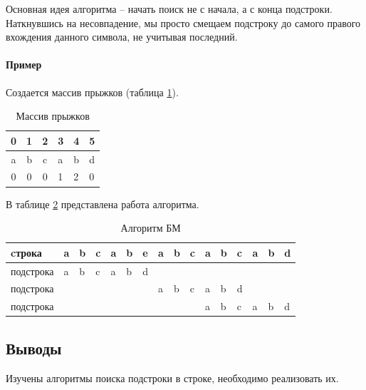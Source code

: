 \documentclass[a4paper,12pt]{article}
\begin{document}
Основная идея алгоритма -- начать поиск не с начала, а с конца
подстроки. Наткнувшись на несовпадение, мы просто смещаем подстроку
до самого правого вхождения данного символа, не учитывая последний.

\paragraph{Пример}

Создается массив прыжков (таблица \ref{table:example2}).

\begin{table}[H]
    \centering
    \caption{Массив прыжков}
    \label{table:example2}
    \begin{tabular}{|c|c|c|l|l|l|}
    \hline
    0 & 1 & 2 & 3 & 4 & 5 \\ \hline
    a & b & c & a & b & d \\ \hline
    0 & 0 & 0 & 1 & 2 & 0 \\ \hline
    \end{tabular}
\end{table}

В таблице \ref{table:bm} представлена работа алгоритма.

\begin{table}[H]
    \centering
    \caption{Алгоритм БМ}
    \label{table:bm}
    \begin{tabular}{|l|l|l|l|l|l|l|l|l|l|l|l|l|l|l|l|}
    \hline
    cтрока & a & b & c & a & b & e & a & b & c & a & b & c & a & b & d \\
    \hline
    подстрока & a & b & c & a & b & \cellcolor[HTML]{FE0000}d & & & & & & & & & \\
    \hline
    подстрока & & & & & & & a & b & c & a & b & \cellcolor[HTML]{FE0000}d & & & \\
    \hline
    подстрока & & & & & & & & & & \cellcolor[HTML]{34FF34}a & \cellcolor[HTML]{34FF34}b & \cellcolor[HTML]{34FF34}c & \cellcolor[HTML]{34FF34}a & \cellcolor[HTML]{34FF34}b & \cellcolor[HTML]{34FF34}d \\
    \hline
    \end{tabular}
\end{table}

\subsection{Выводы}

Изучены алгоритмы поиска подстроки в строке, необходимо реализовать их.
\end{document}
